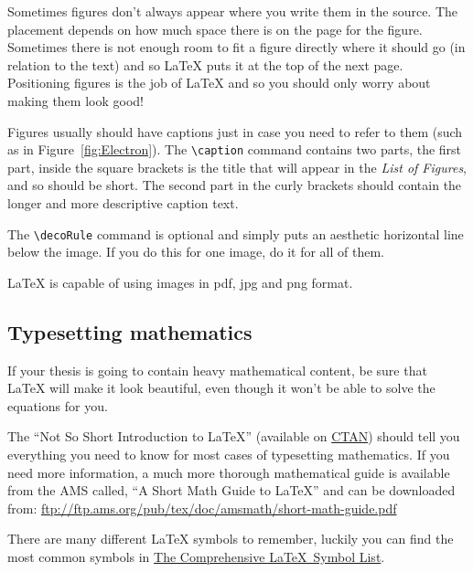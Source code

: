 
Sometimes figures don't always appear where you write them in the source. The placement depends on how much space there is on the page for the figure. Sometimes there is not enough room to fit a figure directly where it should go (in relation to the text) and so \LaTeX{} puts it at the top of the next page. Positioning figures is the job of \LaTeX{} and so you should only worry about making them look good!

Figures usually should have captions just in case you need to refer to them (such as in Figure~\ref{fig:Electron}). The \verb|\caption| command contains two parts, the first part, inside the square brackets is the title that will appear in the \emph{List of Figures}, and so should be short. The second part in the curly brackets should contain the longer and more descriptive caption text.

The \verb|\decoRule| command is optional and simply puts an aesthetic horizontal line below the image. If you do this for one image, do it for all of them.

\LaTeX{} is capable of using images in pdf, jpg and png format.

\subsection{Typesetting mathematics}

If your thesis is going to contain heavy mathematical content, be sure that \LaTeX{} will make it look beautiful, even though it won't be able to solve the equations for you.

The \enquote{Not So Short Introduction to \LaTeX} (available on \href{http://www.ctan.org/tex-archive/info/lshort/english/lshort.pdf}{CTAN}) should tell you everything you need to know for most cases of typesetting mathematics. If you need more information, a much more thorough mathematical guide is available from the AMS called, \enquote{A Short Math Guide to \LaTeX} and can be downloaded from:
\url{ftp://ftp.ams.org/pub/tex/doc/amsmath/short-math-guide.pdf}

There are many different \LaTeX{} symbols to remember, luckily you can find the most common symbols in \href{http://ctan.org/pkg/comprehensive}{The Comprehensive \LaTeX~Symbol List}.

